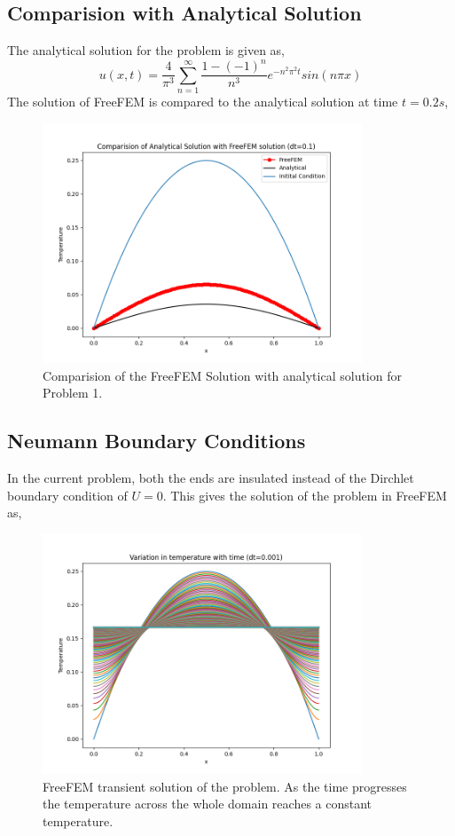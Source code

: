 \documentclass[11pt]{article} %
\begin{document}
\subsection{Comparision with Analytical Solution}
The analytical solution for the problem is given as,
\begin{equation}
u(x,t) = \frac{4}{\pi^3}\sum_{n=1}^{\infty}\frac{1 - (-1)^n}{n^3}e^{-n^2\pi^2 t}sin(n\pi x)
\end{equation}
 The solution of FreeFEM is compared to the analytical solution at time $t=0.2s$,
\begin{figure}[H]
\centering
\includegraphics[width=0.85\textwidth]{figures/p121.png}
\caption{Comparision of the FreeFEM Solution with analytical solution for Problem 1.}
\end{figure}

\subsection{Neumann Boundary Conditions}
In the current problem, both the ends are insulated instead of the Dirchlet boundary condition of $U=0$. This gives the solution of the problem in FreeFEM as,

\begin{figure}[H]
\centering
\includegraphics[width=0.85\textwidth]{figures/p11001n.png}
\caption{FreeFEM transient solution of the problem. As the time progresses the temperature across the whole domain reaches a constant temperature.}
\end{figure}
\end{document}
